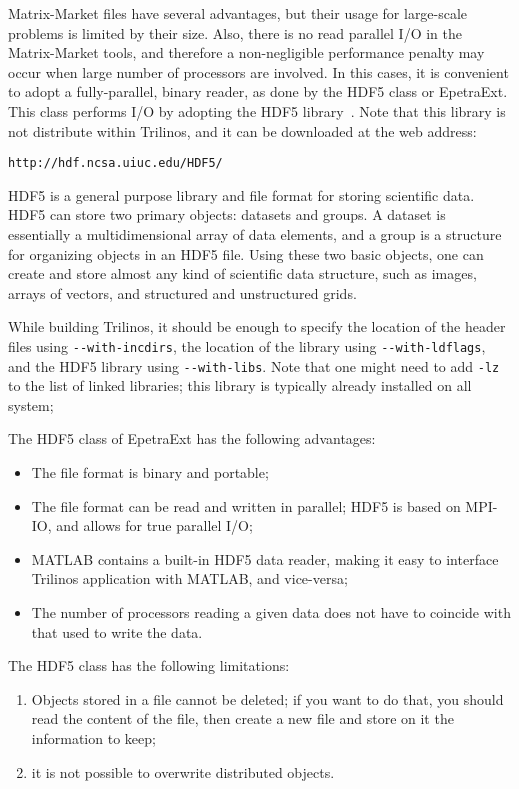 \documentclass[11pt,relax]{SANDreport}
\begin{document}
Matrix-Market files have several advantages, but their usage for large-scale
problems is limited by their size. Also, there is no read parallel I/O in the
Matrix-Market tools, and therefore a non-negligible performance penalty may
occur when large number of processors are involved. In this cases, it is
convenient to adopt a fully-parallel, binary reader, as done by the HDF5 class
or EpetraExt. This class performs I/O by adopting the HDF5
library~\cite{hdf5}. Note that this library is not distribute within Trilinos,
  and it can be downloaded  at the web address:
\begin{verbatim}
http://hdf.ncsa.uiuc.edu/HDF5/
\end{verbatim}
HDF5 is a general purpose library and file format for storing scientific data.
HDF5 can store two primary objects: datasets and groups. A dataset is
essentially a multidimensional array of data elements, and a group is a
structure for organizing objects in an HDF5 file. Using these two basic
objects, one can create and store almost any kind of scientific data
structure, such as images, arrays of vectors, and structured and unstructured
grids. 

While building Trilinos, it should be enough to specify the location of the
header files using \verb!--with-incdirs!, the location of the library using
\verb!--with-ldflags!, and the HDF5 library using \verb!--with-libs!. Note
that one might need to add \verb!-lz! to the list of linked libraries; this library
is typically already installed on all system;

The HDF5 class of EpetraExt has the following advantages:
\begin{itemize}
\item The file format is binary and portable;
\item The file format can be read and written in parallel;
HDF5 is based on MPI-IO, and allows for true parallel I/O;
\item MATLAB contains a built-in HDF5 data reader, making it easy to interface
Trilinos application with MATLAB, and vice-versa;
\item The number of processors reading a given
data does not have to coincide with that used to write the data.
\end{itemize}


The HDF5 class has the following limitations:
\begin{enumerate}
\item Objects stored in a file cannot be deleted; if you want to do that, you should read the 
  content of the file, then create a new file and store on it the information to keep;
\item it is not possible to overwrite distributed objects.
\end{enumerate}
\end{document}
